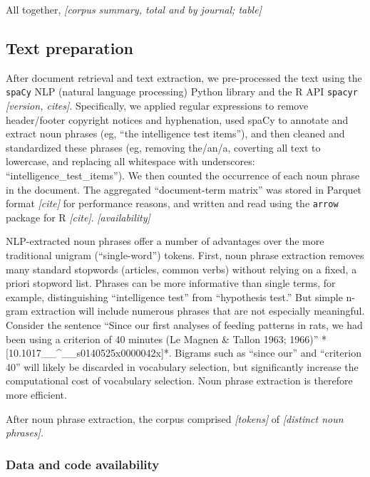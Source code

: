 \documentclass[12pt]{article}
\begin{document}
All together, \emph{{[}corpus summary, total and by journal; table{]}}

\hypertarget{text-preparation}{%
\subsection*{Text preparation}\label{text-preparation}}

After document retrieval and text extraction, we pre-processed the text using the \texttt{spaCy} NLP (natural language processing) Python library and the R API \texttt{spacyr} \emph{{[}version, cites{]}}. Specifically, we applied regular expressions to remove header/footer copyright notices and hyphenation, used spaCy to annotate and extract noun phrases (eg, ``the intelligence test items''), and then cleaned and standardized these phrases (eg, removing the/an/a, coverting all text to lowercase, and replacing all whitespace with underscores: ``intelligence\_test\_items''). We then counted the occurrence of each noun phrase in the document. The aggregated ``document-term matrix'' was stored in Parquet format \emph{{[}cite{]}} for performance reasons, and written and read using the \texttt{arrow} package for R \emph{{[}cite{]}}. \emph{{[}availability{]}}

NLP-extracted noun phrases offer a number of advantages over the more traditional unigram (``single-word'') tokens. First, noun phrase extraction removes many standard stopwords (articles, common verbs) without relying on a fixed, a priori stopword list. Phrases can be more informative than single terms, for example, distinguishing ``intelligence test'' from ``hypothesis test.'' But simple n-gram extraction will include numerous phrases that are not especially meaningful. Consider the sentence ``Since our first analyses of feeding patterns in rats, we had been using a criterion of 40 minutes (Le Magnen \& Tallon 1963; 1966)'' *{[}10.1017\_\_\^{}\_\_s0140525x0000042x{]}*. Bigrams such as ``since our'' and ``criterion 40'' will likely be discarded in vocabulary selection, but significantly increase the computational cost of vocabulary selection. Noun phrase extraction is therefore more efficient.

After noun phrase extraction, the corpus comprised \emph{{[}tokens{]}} of \emph{{[}distinct noun phrases{]}}.

\hypertarget{data-and-code-availability}{%
\subsubsection*{Data and code availability}\label{data-and-code-availability}}
\end{document}
